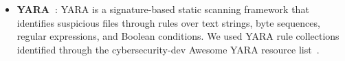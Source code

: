 \begin{itemize}


    \item \textbf{YARA~\cite{yara}}:
    YARA is a signature-based static scanning framework that identifies suspicious files through rules over text strings, byte sequences, regular expressions, and Boolean conditions. We used YARA rule collections identified through the
    cybersecurity-dev Awesome YARA resource
    list~\cite{awesome_yara}.
\end{itemize}





